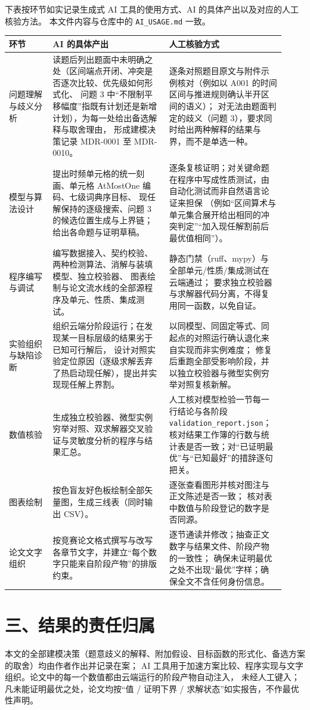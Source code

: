 下表按环节如实记录生成式 AI 工具的使用方式、AI 的具体产出以及对应的人工核验方法。
本文件内容与仓库中的 \nolinkurl{AI_USAGE.md} 一致。

\begingroup
\small
\setlength{\tabcolsep}{5pt}
\renewcommand{\arraystretch}{1.15}
\begin{longtable}{@{}>{\raggedright\arraybackslash}p{0.15\linewidth}>{\raggedright\arraybackslash}p{0.40\linewidth}>{\raggedright\arraybackslash}p{0.37\linewidth}@{}}
\toprule 环节 & AI 的具体产出 & 人工核验方式 \\ \midrule \endhead \bottomrule \endfoot
问题理解与歧义分析 &
读题后列出题面中未明确之处（区间端点开闭、冲突是否逐次比较、优先级如何形式化、
问题 3 中“不限制平移幅度”指既有计划还是新增计划），为每一处给出备选解释与取舍理由，
形成建模决策记录 MDR-0001 至 MDR-0010。 &
逐条对照题目原文与附件示例核对（例如以 A001 的时间区间与推进规则确认半开区间的语义）；
对无法由题面判定的歧义（问题 3），要求同时给出两种解释的结果与界，而不是单选一种。 \\
模型与算法设计 &
提出时频单元格的统一刻画、单元格 AtMostOne 编码、七级词典序目标、
现任解保持的逐级搜索、问题 3 的候选位置生成与上界链；给出各命题与证明草稿。 &
逐条复核证明；对关键命题在程序中写成性质测试，由自动化测试而非自然语言论证来担保
（例如“区间算术与单元集合展开给出相同的冲突判定”“加入现任解割前后最优值相同”）。 \\
程序编写与调试 &
编写数据接入、契约校验、两种检测算法、消解与装填模型、独立校验器、
图表绘制与论文流水线的全部源程序及单元、性质、集成测试。 &
静态门禁（ruff、mypy）与全部单元/性质/集成测试在云端通过；
要求独立校验器与求解器代码分离，不得复用同一函数，以免自证。 \\
实验组织与缺陷诊断 &
组织云端分阶段运行；在发现某一目标层级的结果劣于已知可行解后，
设计对照实验定位原因（逐级求解丢弃了热启动现任解），提出并实现现任解上界割。 &
以同模型、同固定等式、同起点的对照运行确认退化来自实现而非实例难度；
修复后重跑全部受影响阶段，并以独立校验器与微型实例穷举对照复核新解。 \\
数值核验 &
生成独立校验器、微型实例穷举对照、双求解器交叉验证与灵敏度分析的程序与结果汇总。 &
人工核对模型检验一节每一行结论与各阶段 \nolinkurl{validation_report.json}；
核对结果工作簿的行数与统计表是否一致；对“已证明最优”与“已知最好”的措辞逐句把关。 \\
图表绘制 &
按色盲友好色板绘制全部矢量图，生成三线表（同时输出 CSV）。 &
逐张查看图形并核对图注与正文陈述是否一致；
核对表中数值与阶段登记的数字是否同源。 \\
论文文字组织 &
按竞赛论文格式撰写与改写各章节文字，并建立“每个数字只能来自阶段产物”的排版约束。 &
逐节通读并修改；抽查正文数字与结果文件、阶段产物的一致性；
确保未证明最优之处不出现“最优”字样；确保全文不含任何身份信息。 \\
\end{longtable}
\endgroup

\section*{三、结果的责任归属}

本文的全部建模决策（题意歧义的解释、附加假设、目标函数的形式化、备选方案的取舍）均由作者作出并记录在案；
AI 工具用于加速方案比较、程序实现与文字组织。论文中的每一个数值都由云端运行的阶段产物自动注入，
未经人工键入；凡未能证明最优之处，论文均按“值 / 证明下界 / 求解状态”如实报告，不作最优性声明。
